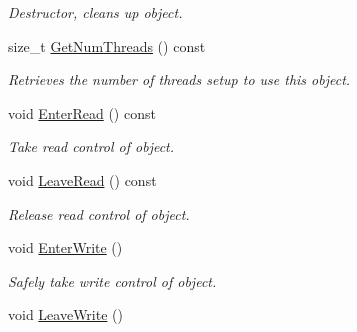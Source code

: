 \begin{DoxyCompactItemize}
\begin{DoxyCompactList}\small\item\em Destructor, cleans up object. \item\end{DoxyCompactList}\item 
size\_\-t \hyperlink{class_concurrency_control_a3a0351a48b92570778544957dd181f17}{GetNumThreads} () const 
\begin{DoxyCompactList}\small\item\em Retrieves the number of threads setup to use this object. \item\end{DoxyCompactList}\item 
\hypertarget{class_concurrency_control_aa2d6142d40a726d64148965aa9bd13fe}{
void \hyperlink{class_concurrency_control_aa2d6142d40a726d64148965aa9bd13fe}{EnterRead} () const }
\label{class_concurrency_control_aa2d6142d40a726d64148965aa9bd13fe}

\begin{DoxyCompactList}\small\item\em Take read control of object. \item\end{DoxyCompactList}\item 
\hypertarget{class_concurrency_control_a98d2523a22ecac7c03e5b10e431d613d}{
void \hyperlink{class_concurrency_control_a98d2523a22ecac7c03e5b10e431d613d}{LeaveRead} () const }
\label{class_concurrency_control_a98d2523a22ecac7c03e5b10e431d613d}

\begin{DoxyCompactList}\small\item\em Release read control of object. \item\end{DoxyCompactList}\item 
void \hyperlink{class_concurrency_control_aadc7743380ba3da2385fd052de30f144}{EnterWrite} ()
\begin{DoxyCompactList}\small\item\em Safely take write control of object. \item\end{DoxyCompactList}\item 
\hypertarget{class_concurrency_control_a1b495ca39efffd3194c771b8c83931cd}{
void \hyperlink{class_concurrency_control_a1b495ca39efffd3194c771b8c83931cd}{LeaveWrite} ()}
\label{class_concurrency_control_a1b495ca39efffd3194c771b8c83931cd}


\end{DoxyCompactItemize}
